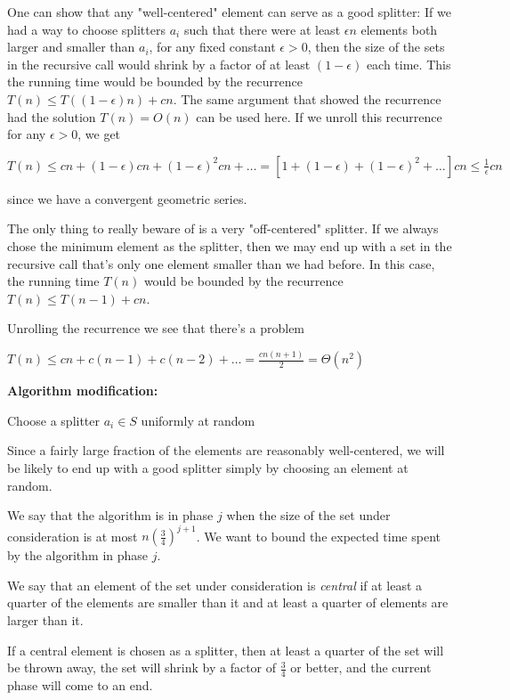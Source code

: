 \documentclass{proc}
\begin{document}
One can show that any "well-centered" element can serve as a good splitter: If we had a way to choose splitters $a_i$ such that there were at least $\epsilon n$ elements both larger and smaller than $a_i$, for any fixed constant $\epsilon > 0$, then the size of the sets in the recursive call would shrink by a factor of at least $(1 - \epsilon)$ each time. This the running time would be bounded by the recurrence $T(n) \le T((1- \epsilon)n) + cn$. The same argument that showed the recurrence had the solution $T(n) = O(n)$ can be used here. If we unroll this recurrence for any $\epsilon > 0$, we get

$T(n) \le cn + (1- \epsilon)cn + (1- \epsilon)^2cn + \ldots = [1 + (1-\epsilon) + (1 - \epsilon)^2 + \ldots]cn \le \frac{1}{\epsilon}cn$

since we have a convergent geometric series.

The only thing to really beware of is a very "off-centered" splitter. If we always chose the minimum element as the splitter, then we may end up with a set in the recursive call that's only one element smaller than we had before. In this case, the running time $T(n)$ would be bounded by the recurrence $T(n) \le T(n - 1) + cn$.

Unrolling the recurrence we see that there's a problem

$T(n) \le cn + c(n-1) + c(n-2) + \ldots = \frac{cn(n+1)}{2} = \Theta(n^2)$

\begin{mdframed}
    \textbf{Algorithm modification:}
    
    Choose a splitter $a_i \in S$ uniformly at random
\end{mdframed}

Since a fairly large fraction of the elements are reasonably well-centered, we will be likely to end up with a good splitter simply by choosing an element at random.

We say that the algorithm is in phase $j$ when the size of the set under consideration is at most $n(\frac{3}{4})^{j+1}$. We want to bound the expected time spent by the algorithm in phase $j$.

We say that an element of the set under consideration is \textit{central} if at least a quarter of the elements are smaller than it and at least a quarter of elements are larger than it.

If a central element is chosen as a splitter, then at least a quarter of the set will be thrown away, the set will shrink by a factor of $\frac{3}{4}$ or better, and the current phase will come to an end.
\end{document}

